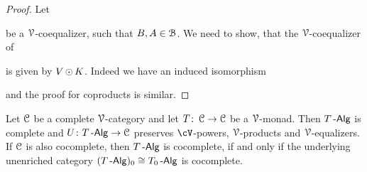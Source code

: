 \documentclass[a4paper,11pt,oneside,openany]{scrbook}
\begin{document}
\begin{proof}
    Let 
       \begin{center}
       \end{center}
    be a $\V$-coequalizer, such that $B,A \in \B$. We need to show, that the $\V$-coequalizer of 
       \begin{center}
       \end{center}
    is given by $V \copw K$. Indeed we have an induced isomorphism
       \begin{center}
       \end{center}
    and the proof for coproducts is similar. 
\end{proof}

\begin{thm}
   Let $\C$ be a complete $\V$-category and let $T \from \C \to \C$ be a $\V$-monad. Then $T\Alg$ is complete and $U \from T\Alg \to \C$ preserves $\cV$-powers, 
   $\V$-products and $\V$-equalizers. If $\C$ is also cocomplete, then $T\Alg$ is cocomplete, if and only if the underlying unenriched category 
   $(T\Alg)_{0} \iso T_{0}\Alg$ is cocomplete.
\end{thm}
\end{document}
